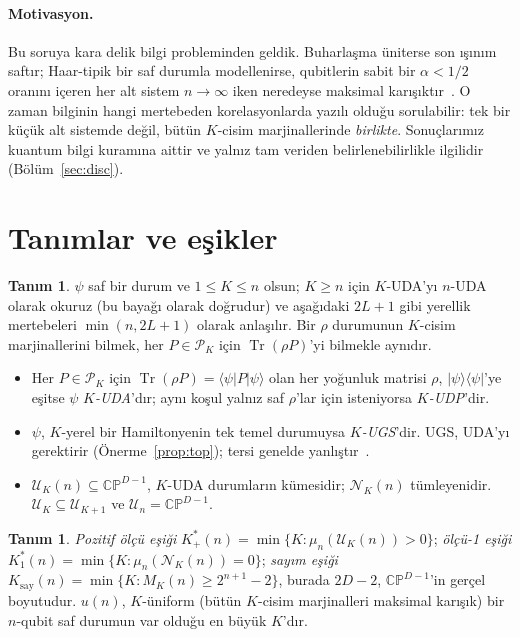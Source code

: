 \documentclass[aps,pra,onecolumn,superscriptaddress,nofootinbib,longbibliography,10pt]{revtex4-2}
\theoremstyle{definition}
\newtheorem{definition}[proposition]{Tanım}
\newcommand{\CP}{\mathbb{CP}}
\newcommand{\Tr}{\operatorname{Tr}}
\newcommand{\Kp}{K^{*}_{+}}
\newcommand{\Ko}{K^{*}_{1}}
\newcommand{\Kc}{K_{\mathrm{say}}}
\begin{document}
\paragraph*{Motivasyon.} Bu soruya kara delik bilgi probleminden geldik. Buharlaşma üniterse son ışınım saftır; Haar-tipik bir saf durumla modellenirse, qubitlerin sabit bir $\alpha<1/2$ oranını içeren her alt sistem $n\to\infty$ iken neredeyse maksimal karışıktır~\cite{Pag93a,Pag93b}. O zaman bilginin hangi mertebeden korelasyonlarda yazılı olduğu sorulabilir: tek bir küçük alt sistemde değil, bütün $K$-cisim marjinallerinde \emph{birlikte}. Sonuçlarımız kuantum bilgi kuramına aittir ve yalnız tam veriden belirlenebilirlikle ilgilidir (Bölüm~\ref{sec:disc}).

\section{Tanımlar ve eşikler}

\begin{definition}
$\psi$ saf bir durum ve $1\le K\le n$ olsun; $K\ge n$ için $K$-UDA'yı $n$-UDA olarak okuruz (bu bayağı olarak doğrudur) ve aşağıdaki $2L+1$ gibi yerellik mertebeleri $\min(n,2L+1)$ olarak anlaşılır. Bir $\rho$ durumunun $K$-cisim marjinallerini bilmek, her $P\in\mathcal P_K$ için $\Tr(\rho P)$'yi bilmekle aynıdır.
\begin{itemize}
\item Her $P\in\mathcal P_K$ için $\Tr(\rho P)=\langle\psi|P|\psi\rangle$ olan her yoğunluk matrisi $\rho$, $|\psi\rangle\langle\psi|$'ye eşitse $\psi$ \emph{$K$-UDA}'dır; aynı koşul yalnız saf $\rho$'lar için isteniyorsa \emph{$K$-UDP}'dir.
\item $\psi$, $K$-yerel bir Hamiltonyenin tek temel durumuysa \emph{$K$-UGS}'dir. UGS, UDA'yı gerektirir (Önerme~\ref{prop:top}); tersi genelde yanlıştır~\cite{KJTV19}.
\item $\mathcal U_K(n)\subseteq\CP^{D-1}$, $K$-UDA durumların kümesidir; $\mathcal N_K(n)$ tümleyenidir. $\mathcal U_K\subseteq\mathcal U_{K+1}$ ve $\mathcal U_n=\CP^{D-1}$.
\end{itemize}
\end{definition}

\begin{definition}
\emph{Pozitif ölçü eşiği} $\Kp(n)=\min\{K:\mu_n(\mathcal U_K(n))>0\}$; \emph{ölçü-1 eşiği} $\Ko(n)=\min\{K:\mu_n(\mathcal N_K(n))=0\}$; \emph{sayım eşiği} $\Kc(n)=\min\{K:M_K(n)\ge2^{n+1}-2\}$, burada $2D-2$, $\CP^{D-1}$'in gerçel boyutudur. $u(n)$, $K$-üniform (bütün $K$-cisim marjinalleri maksimal karışık) bir $n$-qubit saf durumun var olduğu en büyük $K$'dır.
\end{definition}
\end{document}
